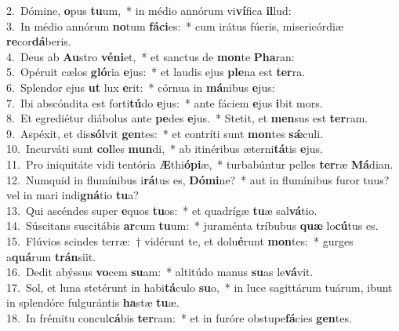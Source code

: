 {2.~}Dómine, \textbf{o}pus \textbf{tu}um,~* in médio annórum vi\textbf{ví}fica \textbf{il}lud:\\
{3.~}In médio annórum \textbf{no}tum \textbf{fá}\textbf{ci}es:~* cum irátus fúeris, misericórdiæ \textbf{re}cor\textbf{dá}beris.\\
{4.~}Deus ab \textbf{Au}stro \textbf{vé}\textbf{ni}et,~* et sanctus de \textbf{mon}te \textbf{Pha}ran:\\
{5.~}Opéruit cælos \textbf{gló}ria \textbf{e}jus:~* et laudis ejus \textbf{ple}na est \textbf{ter}ra.\\
{6.~}Splendor ejus \textbf{ut} lux \textbf{e}rit:~* córnua in \textbf{má}nibus \textbf{e}jus:\\
{7.~}Ibi abscóndita est forti\textbf{tú}do \textbf{e}jus:~* ante fáciem \textbf{e}jus \textbf{i}bit mors.\\
{8.~}Et egrediétur diábolus ante \textbf{pe}des \textbf{e}jus.~* Stetit, et \textbf{men}sus est \textbf{ter}ram.\\
{9.~}Aspéxit, et dis\textbf{sól}vit \textbf{gen}tes:~* et contríti sunt \textbf{mon}tes \textbf{sǽ}culi.\\
{10.~}Incurváti sunt \textbf{col}les \textbf{mun}di,~* ab itinéribus æterni\textbf{tá}tis \textbf{e}jus.\\
{11.~}Pro iniquitáte vidi tentória \textbf{Æ}thi\textbf{ó}\textbf{pi}æ,~* turbabúntur pelles \textbf{ter}ræ \textbf{Má}dian.\\
{12.~}Numquid in flumínibus i\textbf{rá}tus es, \textbf{Dó}\textbf{mi}ne?~* aut in flumínibus furor tuus? vel in mari indi\textbf{gná}tio \textbf{tu}a?\\
{13.~}Qui ascéndes super \textbf{e}quos \textbf{tu}os:~* et quadrígæ \textbf{tu}æ sal\textbf{vá}tio.\\
{14.~}Súscitans suscitábis \textbf{ar}cum \textbf{tu}um:~* juraménta tríbubus \textbf{quæ} lo\textbf{cú}tus es.\\
{15.~}Flúvios scindes terræ:~† vidérunt te, et dolu\textbf{é}runt \textbf{mon}tes:~* gurges a\textbf{quá}rum \textbf{trán}siit.\\
{16.~}Dedit abýssus \textbf{vo}cem \textbf{su}am:~* altitúdo manus \textbf{su}as le\textbf{vá}vit.\\
{17.~}Sol, et luna stetérunt in habi\textbf{tá}culo \textbf{su}o,~* in luce sagittárum tuárum, ibunt in splendóre fulgurántis \textbf{ha}stæ \textbf{tu}æ.\\
{18.~}In frémitu concul\textbf{cá}bis \textbf{ter}ram:~* et in furóre obstupe\textbf{fá}cies \textbf{gen}tes.\\
